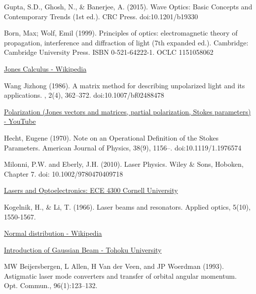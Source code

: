 \documentclass[11pt,a4paper]{article}
\numberwithin{equation}{section}
\begin{document}
\begin{thebibliography}{99}
	Gupta, S.D., Ghosh, N., \& Banerjee, A. (2015). Wave Optics: Basic Concepts and Contemporary Trends (1st ed.). CRC Press. doi:10.1201/b19330
	
	Born, Max; Wolf, Emil (1999). Principles of optics: electromagnetic theory of propagation, interference and diffraction of light (7th expanded ed.). Cambridge: Cambridge University Press. ISBN 0-521-64222-1. OCLC 1151058062
	
	\href{https://en.wikipedia.org/wiki/Jones_calculus}{Jones Calculus - Wikipedia}
	
	Wang Jizhong (1986). A matrix method for describing unpolarized light and its applications. , 2(4), 362–372. doi:10.1007/bf02488478
	
	\href{https://www.youtube.com/watch?v=RowMxWt4mVE&list=LL&index=5}{Polarization (Jones vectors and matrices, partial polarization, Stokes parameters) - YouTube}
	
	Hecht, Eugene (1970). Note on an Operational Definition of the Stokes Parameters. American Journal of Physics, 38(9), 1156–. doi:10.1119/1.1976574    
	
	Milonni, P.W. and Eberly, J.H. (2010). Laser Physics. Wiley \& Sons, Hoboken, Chapter 7. doi: 10.1002/9780470409718
	
	\href{https://www.youtube.com/playlist?list=PLyWzPf87clvEb8T3Xf30tMaUqdbVchrNY}{Lasers and Optoelectronics: ECE 4300 Cornell University} 
	
	Kogelnik, H., \& Li, T. (1966). Laser beams and resonators. Applied optics, 5(10), 1550-1567. 
	
	\href{https://en.wikipedia.org/wiki/Normal_distribution}{Normal distribution - Wikipedia}
	
	\href{https://flex.phys.tohoku.ac.jp/~rsaito/saito20-GaussianBeam.pdf}{Introduction of Gaussian Beam - Tohoku University}
	
	MW Beijersbergen, L Allen, H Van der Veen, and JP Woerdman (1993). Astigmatic laser mode converters and transfer of orbital angular momentum. Opt. Commun., 96(1):123–132.
	
\end{thebibliography}
\end{document}
